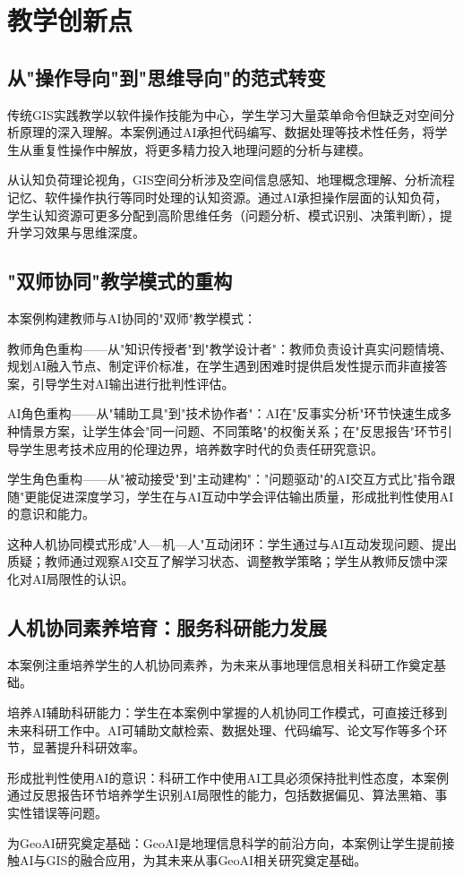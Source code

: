 \section{教学创新点}

\subsection{从"操作导向"到"思维导向"的范式转变}

传统GIS实践教学以软件操作技能为中心，学生学习大量菜单命令但缺乏对空间分析原理的深入理解\citep{汤国安2019}。本案例通过AI承担代码编写、数据处理等技术性任务，将学生从重复性操作中解放，将更多精力投入地理问题的分析与建模。

从认知负荷理论视角，GIS空间分析涉及空间信息感知、地理概念理解、分析流程记忆、软件操作执行等同时处理的认知资源。通过AI承担操作层面的认知负荷，学生认知资源可更多分配到高阶思维任务（问题分析、模式识别、决策判断），提升学习效果与思维深度。

\subsection{"双师协同"教学模式的重构}

本案例构建教师与AI协同的"双师"教学模式：

教师角色重构——从"知识传授者"到"教学设计者"：教师负责设计真实问题情境、规划AI融入节点、制定评价标准，在学生遇到困难时提供启发性提示而非直接答案，引导学生对AI输出进行批判性评估。

AI角色重构——从"辅助工具"到"技术协作者"：AI在"反事实分析"环节快速生成多种情景方案，让学生体会"同一问题、不同策略"的权衡关系；在"反思报告"环节引导学生思考技术应用的伦理边界，培养数字时代的负责任研究意识。

学生角色重构——从"被动接受"到"主动建构"："问题驱动"的AI交互方式比"指令跟随"更能促进深度学习，学生在与AI互动中学会评估输出质量，形成批判性使用AI的意识和能力。

这种人机协同模式形成"人—机—人"互动闭环：学生通过与AI互动发现问题、提出质疑；教师通过观察AI交互了解学习状态、调整教学策略；学生从教师反馈中深化对AI局限性的认识。

\subsection{人机协同素养培育：服务科研能力发展}

本案例注重培养学生的人机协同素养，为未来从事地理信息相关科研工作奠定基础。

培养AI辅助科研能力：学生在本案例中掌握的人机协同工作模式，可直接迁移到未来科研工作中。AI可辅助文献检索、数据处理、代码编写、论文写作等多个环节，显著提升科研效率。

形成批判性使用AI的意识：科研工作中使用AI工具必须保持批判性态度，本案例通过反思报告环节培养学生识别AI局限性的能力，包括数据偏见、算法黑箱、事实性错误等问题。

为GeoAI研究奠定基础：GeoAI是地理信息科学的前沿方向\citep{gai2023}，本案例让学生提前接触AI与GIS的融合应用，为其未来从事GeoAI相关研究奠定基础。